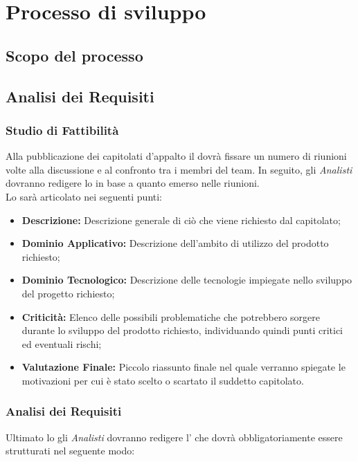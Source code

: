 \section{Processo di sviluppo}

\subsection{Scopo del processo}

\subsection{Analisi dei Requisiti}
\subsubsection{Studio di Fattibilità}
Alla pubblicazione dei capitolati d'appalto il \textsl{\RdP} dovrà fissare un 
numero di riunioni volte alla discussione e al confronto tra i membri del team. 
In seguito, gli \textsl{Analisti} dovranno redigere lo \textsl{\SdF} in base a quanto 
emerso nelle riunioni.\\
Lo \textsl{\SdF} sarà articolato nei seguenti punti:
\begin{itemize}
  \item \textbf{Descrizione:} Descrizione generale di ciò che viene richiesto 
  dal capitolato;
  \item \textbf{Dominio Applicativo:} Descrizione dell'ambito di utilizzo del 
  prodotto richiesto;
  \item \textbf{Dominio Tecnologico:} Descrizione delle tecnologie impiegate 
  nello sviluppo del progetto richiesto;
  \item \textbf{Criticità:} Elenco delle possibili problematiche che potrebbero 
  sorgere durante lo sviluppo del prodotto richiesto, individuando quindi punti 
  critici ed eventuali rischi;
  \item \textbf{Valutazione Finale:} Piccolo riassunto finale nel quale verranno 
  spiegate le motivazioni per cui è stato scelto o scartato il suddetto 
  capitolato.
\end{itemize}

\subsubsection{Analisi dei Requisiti}
Ultimato lo \textsl{\SdF} gli \textsl{Analisti} dovranno redigere l'\textsl{\AdR} 
che dovrà obbligatoriamente essere strutturati nel seguente modo:

